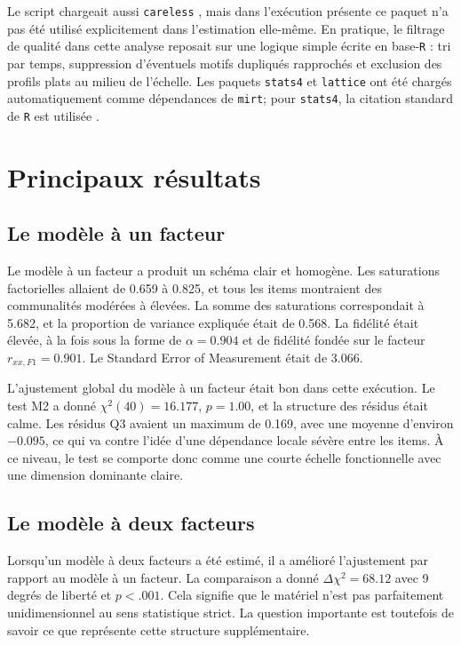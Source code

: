 \documentclass[11pt,a4paper]{article}
\begin{document}
Le script chargeait aussi \texttt{careless} \parencite{YentesWilhelm2023careless}, mais dans l’exécution présente ce paquet n’a pas été utilisé explicitement dans l’estimation elle-même. En pratique, le filtrage de qualité dans cette analyse reposait sur une logique simple écrite en base-\texttt{R} : tri par temps, suppression d’éventuels motifs dupliqués rapprochés et exclusion des profils plats au milieu de l’échelle. Les paquets \texttt{stats4} et \texttt{lattice} \parencite{Sarkar2008lattice} ont été chargés automatiquement comme dépendances de \texttt{mirt}; pour \texttt{stats4}, la citation standard de \texttt{R} est utilisée \parencite{RCore2026}.

\section{Principaux résultats}
\subsection{Le modèle à un facteur}
Le modèle à un facteur a produit un schéma clair et homogène. Les saturations factorielles allaient de 0.659 à 0.825, et tous les items montraient des communalités modérées à élevées. La somme des saturations correspondait à 5.682, et la proportion de variance expliquée était de 0.568. La fidélité était élevée, à la fois sous la forme de $\alpha = 0.904$ et de fidélité fondée sur le facteur $r_{xx,F1} = 0.901$. Le Standard Error of Measurement était de 3.066.

L’ajustement global du modèle à un facteur était bon dans cette exécution. Le test M2 a donné $\chi^2(40)=16.177$, $p=1.00$, et la structure des résidus était calme. Les résidus Q3 avaient un maximum de 0.169, avec une moyenne d’environ $-0.095$, ce qui va contre l’idée d’une dépendance locale sévère entre les items. À ce niveau, le test se comporte donc comme une courte échelle fonctionnelle avec une dimension dominante claire.

\subsection{Le modèle à deux facteurs}
Lorsqu’un modèle à deux facteurs a été estimé, il a amélioré l’ajustement par rapport au modèle à un facteur. La comparaison a donné $\Delta \chi^2 = 68.12$ avec 9 degrés de liberté et $p < .001$. Cela signifie que le matériel n’est pas parfaitement unidimensionnel au sens statistique strict. La question importante est toutefois de savoir ce que représente cette structure supplémentaire.
\end{document}

